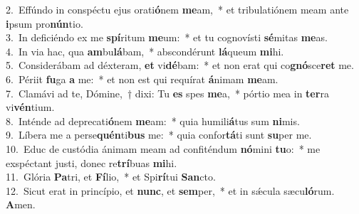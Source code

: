 {2.~}Effúndo in conspéctu ejus orati\textbf{ó}nem \textbf{me}am,~* et tribulatiónem meam ante \textbf{i}psum pro\textbf{nún}tio.\\
{3.~}In deficiéndo ex me \textbf{spí}ritum \textbf{me}um:~* et tu cognovísti \textbf{sé}mitas \textbf{me}as.\\
{4.~}In via hac, qua \textbf{am}bu\textbf{lá}bam,~* abscondérunt \textbf{lá}queum \textbf{mi}hi.\\
{5.~}Considerábam ad déxteram, \textbf{et} vi\textbf{dé}bam:~* et non erat qui co\textbf{gnó}sce\textbf{ret} me.\\
{6.~}Périit \textbf{fu}ga \textbf{a} me:~* et non est qui requírat \textbf{á}nimam \textbf{me}am.\\
{7.~}Clamávi ad te, Dómine,~† dixi: Tu \textbf{es} spes \textbf{me}a,~* pórtio mea in \textbf{ter}ra vi\textbf{vén}tium.\\
{8.~}Inténde ad deprecati\textbf{ó}nem \textbf{me}am:~* quia humili\textbf{á}tus sum \textbf{ni}mis.\\
{9.~}Líbera me a perse\textbf{quén}ti\textbf{bus} me:~* quia confor\textbf{tá}ti sunt \textbf{su}per me.\\
{10.~}Educ de custódia ánimam meam ad confiténdum \textbf{nó}mini \textbf{tu}o:~* me exspéctant justi, donec re\textbf{trí}buas \textbf{mi}hi.\\
{11.~}Glória \textbf{Pa}tri, et \textbf{Fí}lio,~* et Spi\textbf{rí}tui \textbf{San}cto.\\
{12.~}Sicut erat in princípio, et \textbf{nunc}, et \textbf{sem}per,~* et in sǽcula sæcu\textbf{ló}rum. \textbf{A}men.\\
